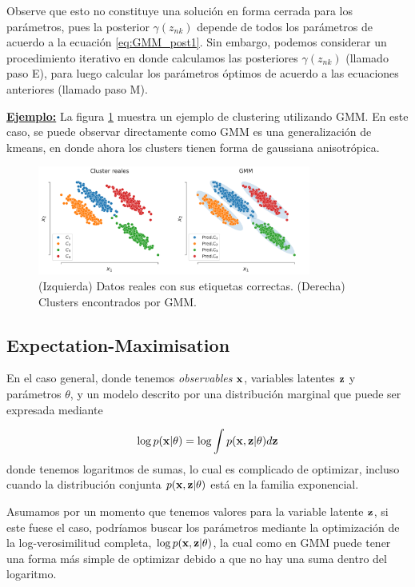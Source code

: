   Observe que esto no constituye una solución en forma cerrada para los parámetros, pues la posterior $\gamma(z_{nk})$ depende de todos los parámetros de acuerdo a la ecuación \eqref{eq:GMM_post1}. Sin embargo, podemos considerar un procedimiento iterativo en donde calculamos las posteriores $\gamma(z_{nk})$ (llamado paso E), para luego calcular los parámetros óptimos de acuerdo a las ecuaciones anteriores (llamado paso M). 



\underline{\textbf{Ejemplo:}} La figura \ref{fig:gmm} muestra un ejemplo de clustering utilizando GMM. En este caso, se puede observar directamente como GMM es una generalización de kmeans, en donde ahora los clusters tienen forma de gaussiana anisotrópica.

\begin{figure}[ht]
  \centering
  \includegraphics[width=0.8\textwidth]{img/cap7_gmm}
  \caption{(Izquierda) Datos reales con sus etiquetas correctas. (Derecha) Clusters encontrados por GMM.}
  \label{fig:gmm}
\end{figure}



\subsection{Expectation-Maximisation} 
\label{sub:GMM_EM}

En el caso general, donde tenemos \emph{observables} $\mathbf{x}$, variables latentes $\mathbf{z}$ y parámetros $\theta$, y un modelo descrito por una distribución marginal que puede ser expresada mediante 

\begin{equation}
	\log p(\mathbf{x}|\theta) = \log \int p(\mathbf{x},\mathbf{z}|\theta)d\mathbf{z}
\end{equation}
donde tenemos logaritmos de sumas, lo cual es complicado de optimizar, incluso cuando la distribución conjunta $p(\mathbf{x},\mathbf{z}|\theta)$ está en la familia exponencial.  

Asumamos por un momento que tenemos valores para la variable latente $\mathbf{z}$, si este fuese el caso, podríamos buscar los parámetros mediante la optimización de la log-verosimilitud completa, $\log p(\mathbf{x}, \mathbf{z} |\theta)$, la cual como en GMM puede tener una forma más simple de optimizar debido a que no hay una suma dentro del logaritmo. 

